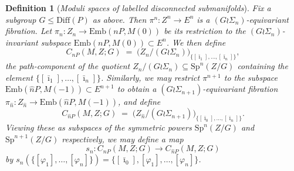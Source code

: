 \documentclass[reqno,a4paper]{article}
\numberwithin{equation}{section}
\theoremstyle{italicised}
\theoremstyle{upright}
\newtheorem{defn}[thm]{Definition}
\theoremstyle{italicised-restate}
\renewcommand{\leq}{\leqslant}
\begin{document}
\begin{defn}[\emph{Moduli spaces of labelled disconnected submanifolds}]\label{d:labelled-disconn-submfld}
Fix a subgroup $G \leq \mathrm{Diff}(P)$ as above. Then $\pi^n \colon Z^n \to E^n$ is a $(G \wr \Sigma_n)$-equivariant fibration. Let $\pi_n \colon Z_n \to \mathrm{Emb}(nP,M(0))$ be its restriction to the $(G \wr \Sigma_n)$-invariant subspace $\mathrm{Emb}(nP,M(0)) \subset E^n$. We then define
\[
C_{nP}(M,Z;G) \;=\; \bigl( Z_n / (G \wr \Sigma_n) \bigr)_{\{ [\bar{\imath}_1] ,\ldots, [\bar{\imath}_n] \}} ,
\]
the path-component of the quotient $Z_n / (G \wr \Sigma_n) \subseteq \mathrm{Sp}^n(Z/G)$ containing the element $\{ [\bar{\imath}_1] ,\ldots, [\bar{\imath}_n] \}$. Similarly, we may restrict $\pi^{n+1}$ to the subspace $\mathrm{Emb}(\hat{n}P,M(-1)) \subset E^{n+1}$ to obtain a $(G \wr \Sigma_{n+1})$-equivariant fibration $\pi_{\hat{n}} \colon Z_{\hat{n}} \to \mathrm{Emb}(\hat{n}P,M(-1))$, and define
\[
C_{\hat{n}P}(M,Z;G) \;=\; \bigl( Z_{\hat{n}} / (G \wr \Sigma_{n+1}) \bigr)_{\{ [\bar{\imath}_0] ,\ldots, [\bar{\imath}_n] \}} .
\]
Viewing these as subspaces of the symmetric powers $\mathrm{Sp}^n(Z/G)$ and $\mathrm{Sp}^{n+1}(Z/G)$ respectively, we may define a map
\[
s_n \colon C_{nP}(M,Z;G) \longrightarrow C_{\hat{n}P}(M,Z;G)
\]
by $s_n(\{ [\varphi_1] ,\ldots, [\varphi_n] \}) = \{ [\bar{\imath}_0] , [\varphi_1] ,\ldots, [\varphi_n] \}$.


\end{defn}
\end{document}

